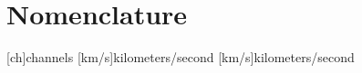 \chapter*{Nomenclature}
\begin{acronym}[]

[ch]{channels}
[km/s]{kilometers/second}
[km/s]{kilometers/second}

\end{acronym}